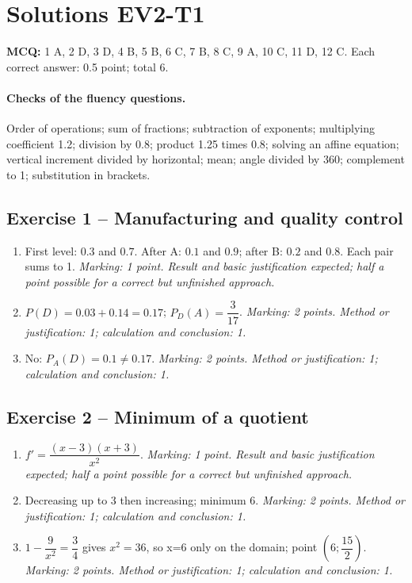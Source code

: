 \clearpage\section*{Solutions EV2-T1}\label{EV2-T1-CORR}
\textbf{MCQ:} 1 A, 2 D, 3 D, 4 B, 5 B, 6 C, 7 B, 8 C, 9 A, 10 C, 11 D, 12 C. Each correct answer: 0.5 point; total 6.
\paragraph{Checks of the fluency questions.} Order of operations; sum of fractions; subtraction of exponents; multiplying coefficient 1.2; division by 0.8; product 1.25 times 0.8; solving an affine equation; vertical increment divided by horizontal; mean; angle divided by 360; complement to 1; substitution in brackets.
\subsection*{Exercise 1 -- Manufacturing and quality control}
\begin{enumerate}
\item First level: $0.3$ and $0.7$. After A: $0.1$ and $0.9$; after B: $0.2$ and $0.8$. Each pair sums to 1. \textit{Marking: 1 point. Result and basic justification expected; half a point possible for a correct but unfinished approach.}
\item $P(D)=0.03+0.14=0.17$; $P_D(A)=\dfrac{3}{17}$. \textit{Marking: 2 points. Method or justification: 1; calculation and conclusion: 1.}
\item No: $P_A(D)=0.1\ne0.17$. \textit{Marking: 2 points. Method or justification: 1; calculation and conclusion: 1.}
\end{enumerate}
\subsection*{Exercise 2 -- Minimum of a quotient}
\begin{enumerate}
\item $f\prime =\dfrac{(x-3)(x+3)}{x^2}$. \textit{Marking: 1 point. Result and basic justification expected; half a point possible for a correct but unfinished approach.}
\item Decreasing up to 3 then increasing; minimum 6. \textit{Marking: 2 points. Method or justification: 1; calculation and conclusion: 1.}
\item $1-\dfrac{9}{x^2}=\dfrac{3}{4}$ gives $x^2=36$, so x=6 only on the domain; point $(6;\dfrac{15}{2})$. \textit{Marking: 2 points. Method or justification: 1; calculation and conclusion: 1.}
\end{enumerate}
